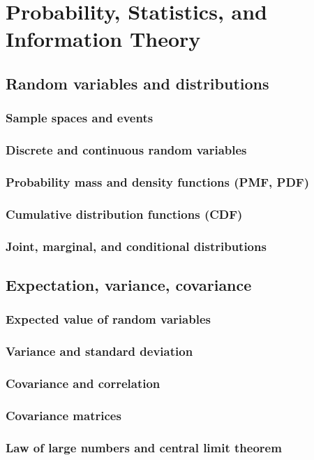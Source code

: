 ﻿\chapter{Probability, Statistics, and Information Theory}
\section{Random variables and distributions}
\subsection{Sample spaces and events}
\subsection{Discrete and continuous random variables}
\subsection{Probability mass and density functions (PMF, PDF)}
\subsection{Cumulative distribution functions (CDF)}
\subsection{Joint, marginal, and conditional distributions}

\section{Expectation, variance, covariance}
\subsection{Expected value of random variables}
\subsection{Variance and standard deviation}
\subsection{Covariance and correlation}
\subsection{Covariance matrices}
\subsection{Law of large numbers and central limit theorem}

